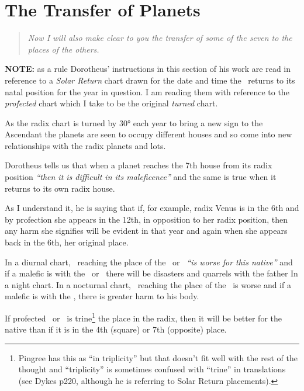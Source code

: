 \section{The Transfer of Planets }
\begin{quote}
\textsl{Now I will also make clear to you the transfer of some of the seven to the places of the others.}
\end{quote}

\begin{mdframed}[backgroundcolor=cyan!5, rightmargin=1em, leftmargin=1em]
\textbf{NOTE:} as a rule Dorotheus' instructions in this section of his work are read in reference to a \textsl{Solar Return} chart drawn for the date and time the \Sun\, returns to its natal position for the year in question. I am reading them with reference to the \textsl{profected} chart which I take to be the original \textsl{turned} chart.

As the radix chart is turned by 30° each year to bring a new sign to the Ascendant the planets are seen to occupy different houses and so come into new relationships with the radix planets and lots.
\end{mdframed}

Dorotheus  tells us that when a planet reaches the 7th house from its radix position \textsl{``then it is difficult in its maleficence''} and the same is true when it returns to its own radix house. 

\begin{mdframed}[backgroundcolor=cyan!5, rightmargin=1em, leftmargin=1em]
As I understand it, he is saying that if, for example, radix Venus is in the 6th and by profection she appears in the 12th, in opposition to her radix position, then any harm she signifies will be evident in that year and again when she appears back in the 6th, her original place.
\end{mdframed}

In  a diurnal chart, \Mars\, reaching the place of the \Sun\, or \Jupiter\, \textsl{``is worse for this native''} and if a malefic is with the \Sun\, or \Jupiter\, there will be disasters and quarrels with the father In a night chart. In a nocturnal chart, \Saturn\, reaching the place of the \Moon\, is worse and if a malefic is with the \Moon, there is greater harm to his body.

If  profected \Saturn\, or \Mars\, is trine\footnote{Pingree has this as ``in triplicity'' but that doesn't fit well with the rest of the thought and ``triplicity'' is sometimes confused with ``trine'' in translations (see Dykes p220, although he is referring to Solar Return placements).} the place in the radix, then it will be better for the native than if it is in the 4th (square) or 7th (opposite) place.

